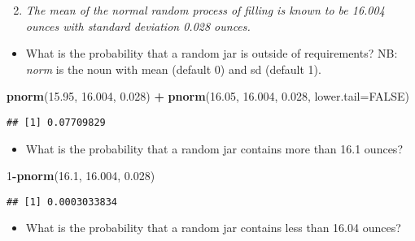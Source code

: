 \documentclass[ignorenonframetext,]{beamer}
\newenvironment{Shaded}{\begin{snugshade}}{\end{snugshade}}
\newcommand{\DataTypeTok}[1]{\textcolor[rgb]{0.13,0.29,0.53}{#1}}
\newcommand{\DecValTok}[1]{\textcolor[rgb]{0.00,0.00,0.81}{#1}}
\newcommand{\FloatTok}[1]{\textcolor[rgb]{0.00,0.00,0.81}{#1}}
\newcommand{\KeywordTok}[1]{\textcolor[rgb]{0.13,0.29,0.53}{\textbf{#1}}}
\newcommand{\NormalTok}[1]{#1}
\newcommand{\OperatorTok}[1]{\textcolor[rgb]{0.81,0.36,0.00}{\textbf{#1}}}
\newcommand{\OtherTok}[1]{\textcolor[rgb]{0.56,0.35,0.01}{#1}}
\newcommand{\StringTok}[1]{\textcolor[rgb]{0.31,0.60,0.02}{#1}}
\providecommand{\tightlist}{%
  \setlength{\itemsep}{0pt}\setlength{\parskip}{0pt}}
\begin{document}
\begin{frame}[fragile]

\begin{enumerate}[<+->]
\setcounter{enumi}{1}
\tightlist
\item
  \emph{The mean of the normal random process of filling is known to be
  16.004 ounces with standard deviation 0.028 ounces.}
\end{enumerate}

\begin{itemize}[<+->]
\tightlist
\item
  What is the probability that a random jar is outside of requirements?
  NB: \emph{norm} is the noun with mean (default 0) and sd (default 1).
\end{itemize}

\begin{Shaded}
\begin{Highlighting}[]
\KeywordTok{pnorm}\NormalTok{(}\FloatTok{15.95}\NormalTok{, }\FloatTok{16.004}\NormalTok{, }\FloatTok{0.028}\NormalTok{) }\OperatorTok{+}\StringTok{ }\KeywordTok{pnorm}\NormalTok{(}\FloatTok{16.05}\NormalTok{, }\FloatTok{16.004}\NormalTok{, }\FloatTok{0.028}\NormalTok{, }\DataTypeTok{lower.tail=}\OtherTok{FALSE}\NormalTok{)}
\end{Highlighting}
\end{Shaded}

\begin{verbatim}
## [1] 0.07709829
\end{verbatim}

\begin{itemize}[<+->]
\tightlist
\item
  What is the probability that a random jar contains more than 16.1
  ounces?
\end{itemize}

\begin{Shaded}
\begin{Highlighting}[]
\DecValTok{1}\OperatorTok{-}\KeywordTok{pnorm}\NormalTok{(}\FloatTok{16.1}\NormalTok{, }\FloatTok{16.004}\NormalTok{, }\FloatTok{0.028}\NormalTok{)}
\end{Highlighting}
\end{Shaded}

\begin{verbatim}
## [1] 0.0003033834
\end{verbatim}

\begin{itemize}[<+->]
\tightlist
\item
  What is the probability that a random jar contains less than 16.04
  ounces?
\end{itemize}


\end{frame}
\end{document}
